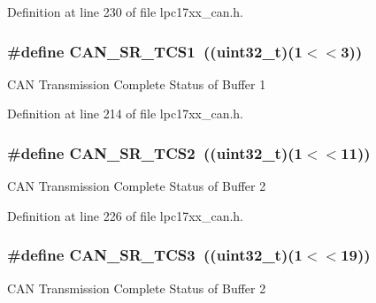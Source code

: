 \-Definition at line 230 of file lpc17xx\-\_\-can.\-h.

\hypertarget{group___c_a_n___private___macros_gad3fc9e0cf64214f0a97d6edb2deb677c}{
\subsubsection[{\-C\-A\-N\-\_\-\-S\-R\-\_\-\-T\-C\-S1}]{\setlength{\rightskip}{0pt plus 5cm}\#define {\bf \-C\-A\-N\-\_\-\-S\-R\-\_\-\-T\-C\-S1}~((uint32\-\_\-t)(1$<$$<$3))}}\label{group___c_a_n___private___macros_gad3fc9e0cf64214f0a97d6edb2deb677c}
\-C\-A\-N \-Transmission \-Complete \-Status of \-Buffer 1 

\-Definition at line 214 of file lpc17xx\-\_\-can.\-h.

\hypertarget{group___c_a_n___private___macros_ga3026226d9652696aaea7ea589e1bd0da}{
\subsubsection[{\-C\-A\-N\-\_\-\-S\-R\-\_\-\-T\-C\-S2}]{\setlength{\rightskip}{0pt plus 5cm}\#define {\bf \-C\-A\-N\-\_\-\-S\-R\-\_\-\-T\-C\-S2}~((uint32\-\_\-t)(1$<$$<$11))}}\label{group___c_a_n___private___macros_ga3026226d9652696aaea7ea589e1bd0da}
\-C\-A\-N \-Transmission \-Complete \-Status of \-Buffer 2 

\-Definition at line 226 of file lpc17xx\-\_\-can.\-h.

\hypertarget{group___c_a_n___private___macros_ga16e52afb875c0447e107a96b7de1e646}{
\subsubsection[{\-C\-A\-N\-\_\-\-S\-R\-\_\-\-T\-C\-S3}]{\setlength{\rightskip}{0pt plus 5cm}\#define {\bf \-C\-A\-N\-\_\-\-S\-R\-\_\-\-T\-C\-S3}~((uint32\-\_\-t)(1$<$$<$19))}}\label{group___c_a_n___private___macros_ga16e52afb875c0447e107a96b7de1e646}
\-C\-A\-N \-Transmission \-Complete \-Status of \-Buffer 2 

